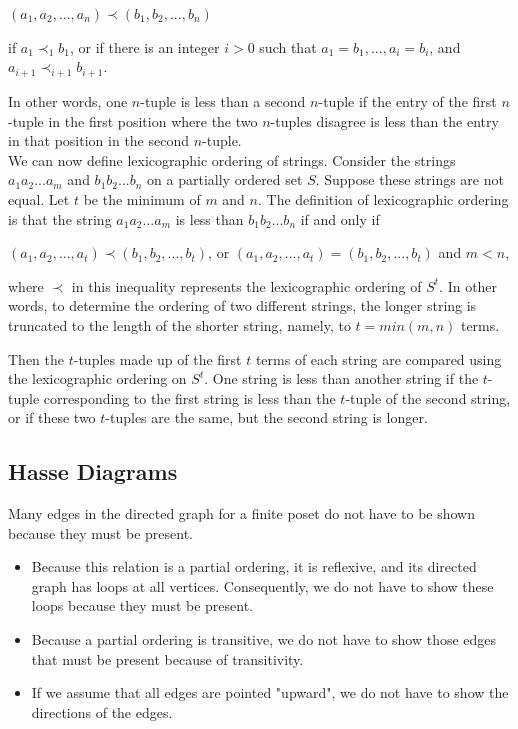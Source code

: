 \documentclass[11pt]{article}
\begin{document}
$(a_1, a_2, ..., a_n) \prec (b_1, b_2, ..., b_n)$

\noindent if $a_1 \prec_1 b_1$, or if there is an integer $i > 0$ such that $a_1 = b_1, ..., a_i = b_i$, and $a_{i+1} \prec_{i+1} b_{i+1}$. 

\noindent In other words, one $n$-tuple is less than a second $n$-tuple if the entry of the first $n$-tuple in the first position where the two $n$-tuples disagree is less than the entry in that position in the second $n$-tuple.\\


We can now define lexicographic ordering of strings. Consider the strings $a_1a_2...a_m$ and $b_1b_2...b_n$ on a partially ordered set $S$. Suppose these strings are not equal. Let $t$ be the minimum of $m$ and $n$. The definition of lexicographic ordering is that the string $a_1a_2...a_m$ is less than $b_1b_2...b_n$ if and only if

$(a_1, a_2, ..., a_t) \prec (b_1, b_2, ..., b_t)$, or
$(a_1, a_2, ..., a_t) = (b_1, b_2, ..., b_t)$ and $m < n$,

\noindent where $\prec$ in this inequality represents the lexicographic ordering of $S^t$. In other words, to determine the ordering of two different strings, the longer string is truncated to the length of the shorter string, namely, to $t = min(m, n)$ terms.

Then the $t$-tuples made up of the first $t$ terms of each string are compared using the lexicographic ordering on $S^t$. One string is less than another string if the $t$-tuple corresponding to the first string is less than the $t$-tuple of the second string, or if these two $t$-tuples are the same, but the second string is longer.

\subsection{Hasse Diagrams}

Many edges in the directed graph for a finite poset do not have to be shown because they must be present. 
\begin{itemize}
    \item Because this relation is a partial ordering, it is reflexive, and its directed graph has loops at all vertices. Consequently, we do not have to show these loops because they must be present.
    \item Because a partial ordering is transitive, we do not have to show those edges that must be present because of transitivity.
    \item If we assume that all edges are pointed "upward", we do not have to show the directions of the edges.
\end{itemize}
\end{document}
